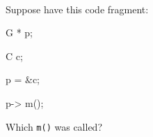 
\\



Suppose have this code fragment:

\begin{console}

G * p;

C c;

p = &c;

p-> m();

\end{console}

Which \texttt{m()} was called?

